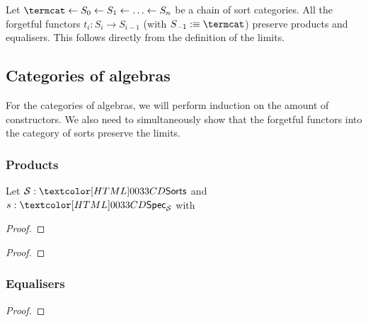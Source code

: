 \begin{remark}
  Let $\termcat \from S_0 \from S_1 \from \hdots \from S_n$ be a chain
  of sort categories. All the forgetful functors
  $t_i : S_i \to S_{i-1}$ (with $S_{-1} \ddefeq \termcat$) preserve
  products and equalisers. This follows directly from the definition
  of the limits.
\end{remark}

\subsection{Categories of algebras}
For the categories of algebras, we will perform induction on the
amount of constructors. We also need to simultaneously show that the
forgetful functors into the category of sorts preserve the limits.

\subsubsection{Products}

\begin{lemma}
  Let $\Ss : \sortsty$ and $s : \specty_{\Ss}$ with
\end{lemma}

\begin{proof}
  
\end{proof}

\begin{lemma}
  
\end{lemma}

\begin{proof}
  
\end{proof}

\subsubsection{Equalisers}

\begin{lemma}
  
\end{lemma}

\begin{proof}
  
\end{proof}

\begin{lemma}
  
\end{lemma}

